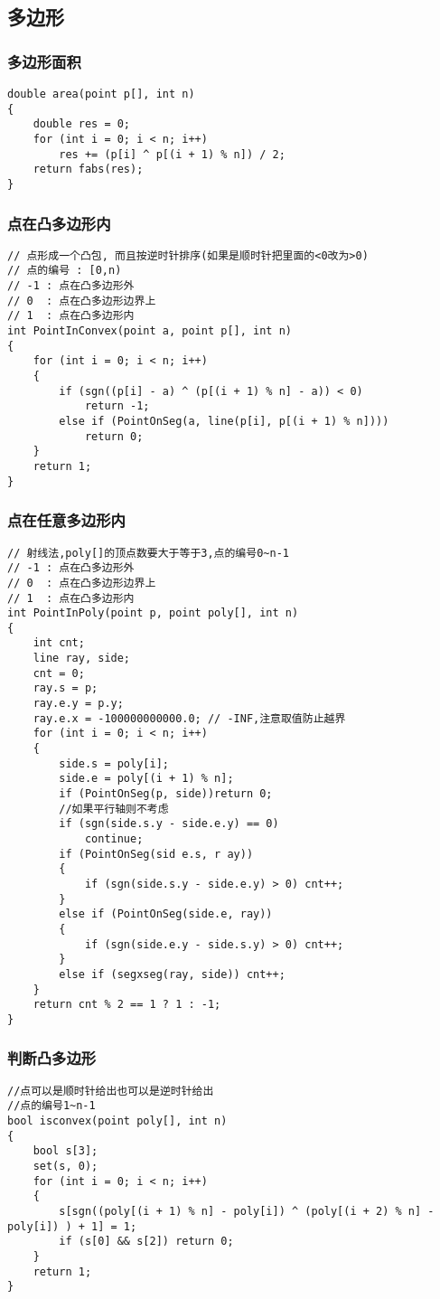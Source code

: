 \documentclass[a4]{article}
\begin{document}
\subsection{多边形}
\subsubsection{多边形面积}
\begin{lstlisting}
double area(point p[], int n)
{
    double res = 0;
    for (int i = 0; i < n; i++)
        res += (p[i] ^ p[(i + 1) % n]) / 2;
    return fabs(res);
}
\end{lstlisting}
\subsubsection{点在凸多边形内}
\begin{lstlisting}
// 点形成一个凸包, 而且按逆时针排序(如果是顺时针把里面的<0改为>0)
// 点的编号 : [0,n)
// -1 : 点在凸多边形外
// 0  : 点在凸多边形边界上
// 1  : 点在凸多边形内
int PointInConvex(point a, point p[], int n)
{
    for (int i = 0; i < n; i++)
    {
        if (sgn((p[i] - a) ^ (p[(i + 1) % n] - a)) < 0)
            return -1;
        else if (PointOnSeg(a, line(p[i], p[(i + 1) % n])))
            return 0;
    }
    return 1;
}
\end{lstlisting}
\subsubsection{点在任意多边形内}
\begin{lstlisting}
// 射线法,poly[]的顶点数要大于等于3,点的编号0~n-1
// -1 : 点在凸多边形外
// 0  : 点在凸多边形边界上
// 1  : 点在凸多边形内
int PointInPoly(point p, point poly[], int n)
{
    int cnt;
    line ray, side;
    cnt = 0;
    ray.s = p;
    ray.e.y = p.y;
    ray.e.x = -100000000000.0; // -INF,注意取值防止越界
    for (int i = 0; i < n; i++)
    {
        side.s = poly[i];
        side.e = poly[(i + 1) % n];
        if (PointOnSeg(p, side))return 0;
        //如果平行轴则不考虑
        if (sgn(side.s.y - side.e.y) == 0)
            continue;
        if (PointOnSeg(sid e.s, r ay))
        {
            if (sgn(side.s.y - side.e.y) > 0) cnt++;
        }
        else if (PointOnSeg(side.e, ray))
        {
            if (sgn(side.e.y - side.s.y) > 0) cnt++;
        }
        else if (segxseg(ray, side)) cnt++;
    }
    return cnt % 2 == 1 ? 1 : -1;
}
\end{lstlisting}
\subsubsection{判断凸多边形}
\begin{lstlisting}
//点可以是顺时针给出也可以是逆时针给出
//点的编号1~n-1
bool isconvex(point poly[], int n)
{
    bool s[3];
    set(s, 0);
    for (int i = 0; i < n; i++)
    {
        s[sgn((poly[(i + 1) % n] - poly[i]) ^ (poly[(i + 2) % n] - poly[i]) ) + 1] = 1;
        if (s[0] && s[2]) return 0;
    }
    return 1;
}
\end{lstlisting}
\end{document}
